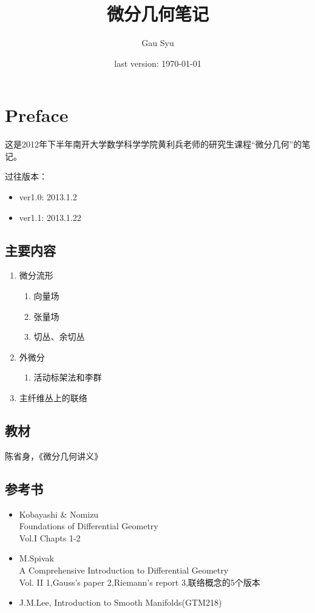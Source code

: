 \documentclass[winfonts,UTF8,c5size,a4paper,fancyhdr,hyperref,titlepage,nocap]{ctexart}
\title{微分几何笔记}
\author{Gau Syu}
\date{last version: \today}
\theoremstyle{definition}
\theoremstyle{remark}
\numberwithin{equation}{subsection}
\begin{document}
\maketitle
\pagestyle{plain}
\section*{Preface}
这是2012年下半年南开大学数学科学学院黄利兵老师的研究生课程“微分几何”的笔记。

过往版本：
\begin{itemize}
  \item ver1.0: 2013.1.2
  \item ver1.1: 2013.1.22
\end{itemize}

\subsection{主要内容}
\begin{enumerate}
  \item 微分流形
  \begin{enumerate}
    \item 向量场
    \item 张量场
    \item 切丛、余切丛
  \end{enumerate}
  \item 外微分
  \begin{enumerate}
    \item 活动标架法和李群
  \end{enumerate}
  \item 主纤维丛上的联络
\end{enumerate}
\subsection{教材}
陈省身，《微分几何讲义》
\subsection{参考书}
\begin{itemize}
  \item Kobayashi \& Nomizu\\
Foundations of Differential Geometry\\
Vol.I Chapts 1-2
  \item M.Spivak\\
A Comprehensive Introduction to Differential Geometry\\
Vol. II 1,Gauss's paper 2,Riemann's report 3,联络概念的5个版本
  \item J.M.Lee, Introduction to Smooth Manifolds(GTM218)
\end{itemize}
\tableofcontents
\newpage
\end{document}
